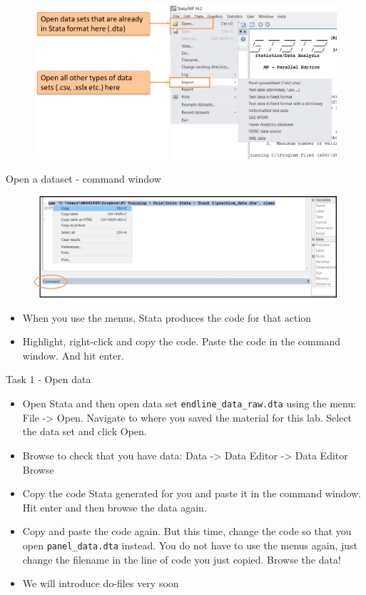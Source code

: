 \documentclass[aspectratio=169]{beamer}
\begin{document}
\begin{frame}{}
	\begin{figure}
		\centering
		\includegraphics[width=\linewidth]{img/open_dataset_menu}
	\end{figure}
\end{frame}

\begin{frame}[fragile]{Open a dataset - command window}
	\begin{figure}
		\centering
		\includegraphics[width=\linewidth]{img/open_data_command}
	\end{figure}
	\begin{itemize}
		\item When you use the menus, Stata produces the code for that action
		\item Highlight, right-click and copy the code. Paste the code in the command window. And hit enter.
	\end{itemize}
\end{frame}

\begin{frame}{Task 1 - Open data}
	\begin{itemize}
		\item Open Stata and then open data set \texttt{endline\_data\_raw.dta} using the menu: File -> Open. Navigate to where you saved the material for this lab. Select the data set and click Open.
		\item Browse to check that you have data: Data -> Data Editor -> Data Editor Browse
		\item Copy the code Stata generated for you and paste it in the command window. Hit enter and then browse the data again.
		\item Copy and paste the code again. But this time, change the code so that you open \texttt{panel\_data.dta} instead. You do not have to use the menus again, just change the filename in the line of code you just copied. Browse the data!
		\item We will introduce do-files very soon
	\end{itemize}
\end{frame}
\end{document}
